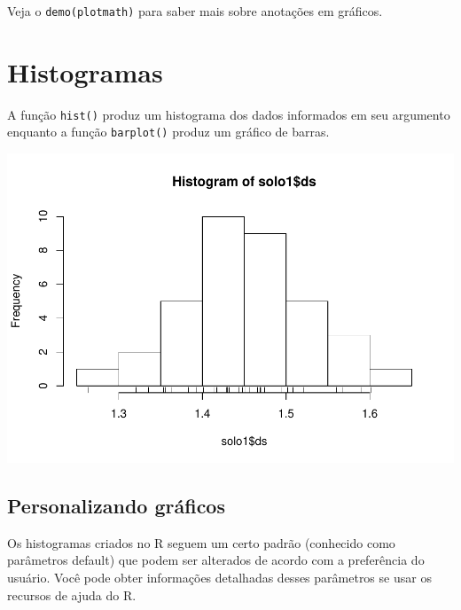 \documentclass[]{book}
\newenvironment{Shaded}{\begin{snugshade}}{\end{snugshade}}
\newcommand{\KeywordTok}[1]{\textcolor[rgb]{0.13,0.29,0.53}{\textbf{#1}}}
\newcommand{\NormalTok}[1]{#1}
\newcommand{\OperatorTok}[1]{\textcolor[rgb]{0.81,0.36,0.00}{\textbf{#1}}}
\begin{document}
Veja o \texttt{demo(plotmath)} para saber mais sobre anotações em gráficos.

\hypertarget{histogramas}{%
\section{Histogramas}\label{histogramas}}

A função \texttt{hist()} produz um histograma dos dados informados em seu argumento enquanto a função \texttt{barplot()} produz um gráfico de barras.

\begin{Shaded}
\end{Shaded}

\includegraphics{TudodoR_files/figure-latex/unnamed-chunk-167-1.pdf}

\hypertarget{personalizando-graficos}{%
\subsection{Personalizando gráficos}\label{personalizando-graficos}}

Os histogramas criados no R seguem um certo padrão (conhecido como parâmetros
default) que podem ser alterados de acordo com a preferência do usuário. Você pode obter
informações detalhadas desses parâmetros se usar os recursos de ajuda do R.
\end{document}
